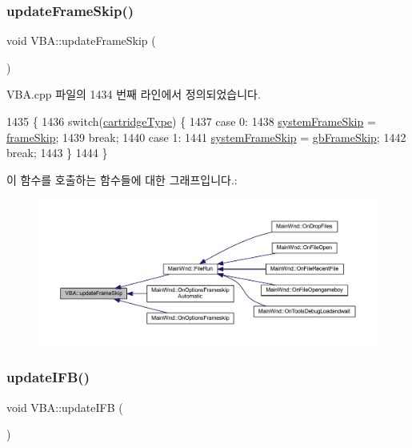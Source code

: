 \subsubsection{\texorpdfstring{update\+Frame\+Skip()}{updateFrameSkip()}}
{\footnotesize\ttfamily void V\+B\+A\+::update\+Frame\+Skip (\begin{DoxyParamCaption}{ }\end{DoxyParamCaption})}



V\+B\+A.\+cpp 파일의 1434 번째 라인에서 정의되었습니다.


\begin{DoxyCode}
1435 \{
1436   \textcolor{keywordflow}{switch}(\mbox{\hyperlink{class_v_b_a_af300759fcbc7eeb00ce73f956fc5ddb7}{cartridgeType}}) \{
1437   \textcolor{keywordflow}{case} 0:
1438     \mbox{\hyperlink{_v_b_a_8cpp_ac88aa402d015fda6917b150c22a28968}{systemFrameSkip}} = \mbox{\hyperlink{_globals_8cpp_a668e22999d7fcea3ed14130fd680b795}{frameSkip}};
1439     \textcolor{keywordflow}{break};
1440   \textcolor{keywordflow}{case} 1:
1441     \mbox{\hyperlink{_v_b_a_8cpp_ac88aa402d015fda6917b150c22a28968}{systemFrameSkip}} = \mbox{\hyperlink{_g_b_8cpp_a2139360d32d74969f470ef05414ecaf8}{gbFrameSkip}};
1442     \textcolor{keywordflow}{break};
1443   \}
1444 \}
\end{DoxyCode}
이 함수를 호출하는 함수들에 대한 그래프입니다.\+:
\nopagebreak
\begin{figure}[H]
\begin{center}
\leavevmode
\includegraphics[width=350pt]{class_v_b_a_a2b3524193d398b041e90907430361ed8_icgraph}
\end{center}
\end{figure}
\mbox{\label{class_v_b_a_ab1caa25635cd40fc3b49b5d325cc65ef}} 
\subsubsection{\texorpdfstring{update\+I\+F\+B()}{updateIFB()}}
{\footnotesize\ttfamily void V\+B\+A\+::update\+I\+FB (\begin{DoxyParamCaption}{ }\end{DoxyParamCaption})}



